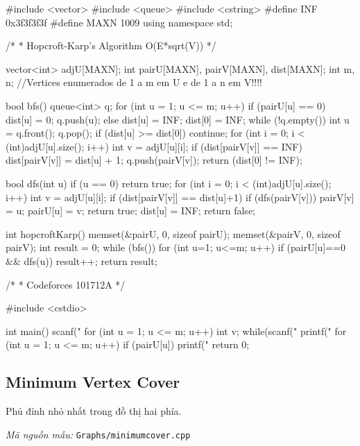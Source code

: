 \documentclass[11pt]{article}
\newcommand{\codepath}[1]{\par\noindent\textit{Mã nguồn mẫu:} \texttt{#1}\par}
\begin{document}
\begingroup\scriptsize
\begin{vncode}
#include <vector>
#include <queue>
#include <cstring>
#define INF 0x3f3f3f3f
#define MAXN 1009
using namespace std;

/*
 * Hopcroft-Karp's Algorithm O(E*sqrt(V))
 */

vector<int> adjU[MAXN];
int pairU[MAXN], pairV[MAXN], dist[MAXN];
int m, n;
//Vertices enumerados de 1 a m em U e de 1 a n em V!!!!

bool bfs() {
	queue<int> q;
	for (int u = 1; u <= m; u++) {
		if (pairU[u] == 0) {
			dist[u] = 0; q.push(u);
		}
		else dist[u] = INF;
	}
	dist[0] = INF;
	while (!q.empty()) {
		int u = q.front(); q.pop();
		if (dist[u] >= dist[0]) continue;
		for (int i = 0; i < (int)adjU[u].size(); i++) {
			int v = adjU[u][i];
			if (dist[pairV[v]] == INF) {
				dist[pairV[v]] = dist[u] + 1;
				q.push(pairV[v]);
			}
		}
	}
	return (dist[0] != INF);
}

bool dfs(int u) {
	if (u == 0) return true;
	for (int i = 0; i < (int)adjU[u].size(); i++) {
		int v = adjU[u][i];
		if (dist[pairV[v]] == dist[u]+1) {
			if (dfs(pairV[v])) {
				pairV[v] = u; pairU[u] = v;
				return true;
			}
		}
	}
	dist[u] = INF;
	return false;
}

int hopcroftKarp() {
	memset(&pairU, 0, sizeof pairU);
	memset(&pairV, 0, sizeof pairV);
	int result = 0;
	while (bfs()) {
		for (int u=1; u<=m; u++) {
			if (pairU[u]==0 && dfs(u))
				result++;
		}
	}
	return result;
}

/*
 * Codeforces 101712A
 */

#include <cstdio>

int main() {
	scanf("%
	for (int u = 1; u <= m; u++) {
		int v;
		while(scanf("%
	}
	printf("%
	for (int u = 1; u <= m; u++) {
		if (pairU[u]) printf("%
	}
	return 0;
}
\end{vncode}
\endgroup


\subsection{Minimum Vertex Cover}

Phủ đỉnh nhỏ nhất trong đồ thị hai phía.

\codepath{Graphs/minimumcover.cpp}
\end{document}
